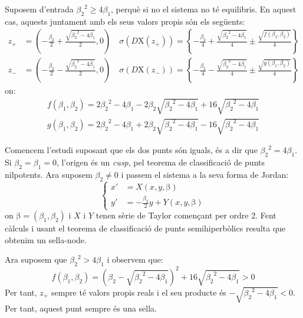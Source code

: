 \documentclass[a4paper]{article}
\newcommand{\vf}[1]{\boldsymbol{\mathrm{#1}}} %
\theoremstyle{definition}
\begin{document}
Suposem d'entrada ${\beta_2}^2\geq 4\beta_1$, perquè si no el sistema no té equilibris. En aquest cas, aquests juntament amb els seus valors propis són els següents:
\begin{align}\label{ex7-vaps}
  z_+ & =\left(-\frac{\beta_2}{2}+\frac{\sqrt{{\beta_2}^2-4\beta_1}}{2},0\right)\quad \sigma(D\vf{X}(z_+))=\left\{-\frac{\beta_2}{4}+\frac{\sqrt{{\beta_2}^2-4\beta_1}}{4}\pm\frac{\sqrt{f(\beta_1,\beta_2)}}{4}\right\} \\
  z_- & =\left(-\frac{\beta_2}{2}-\frac{\sqrt{{\beta_2}^2-4\beta_1}}{2},0\right)\quad \sigma(D\vf{X}(z_-))=\left\{-\frac{\beta_2}{4}-\frac{\sqrt{{\beta_2}^2-4\beta_1}}{4}\pm\frac{\sqrt{g(\beta_1,\beta_2)}}{4}\right\}
\end{align}
on:
\begin{align*}
  f(\beta_1,\beta_2)=2{\beta_2}^2-4\beta_1-2\beta_2\sqrt{{\beta_2}^2-4\beta_1}+16\sqrt{{\beta_2}^2-4\beta_1} \\
  g(\beta_1,\beta_2)=2{\beta_2}^2-4\beta_1+2\beta_2\sqrt{{\beta_2}^2-4\beta_1}-16\sqrt{{\beta_2}^2-4\beta_1}
\end{align*}

Comencem l'estudi suposant que els dos punts són iguals, és a dir que ${\beta_2}^2=4\beta_1$. Si $\beta_2=\beta_1=0$, l'origen és un \emph{cusp}, pel teorema de classificació de punts nilpotents. Ara suposem $\beta_2\ne 0$ i passem el sistema a la seva forma de Jordan:
\begin{equation}
  \left\{
  \begin{aligned}
    x' & =X(x,y,\vf\beta)                     \\
    y' & =-\frac{\beta_2}{2}y+Y(x,y,\vf\beta)
  \end{aligned}
  \right.
\end{equation}
on $\vf\beta=(\beta_1,\beta_2)$ i $X$ i $Y$ tenen sèrie de Taylor començant per ordre 2. Fent càlculs i usant el teorema de classificació de punts semihiperbòlics resulta que obtenim un sella-node.

Ara suposem que ${\beta_2}^2>4\beta_1$ i observem que: $$f(\beta_1,\beta_2)={\left(\beta_2-\sqrt{{\beta_2}^2-4\beta_1}\right)}^2+16\sqrt{{\beta_2}^2-4\beta_1}> 0$$
Per tant, $z_+$ sempre té valors propis reals i el seu producte és $-\sqrt{{\beta_2}^2-4\beta_1}< 0$. Per tant, aquest punt sempre és una sella.
\end{document}
